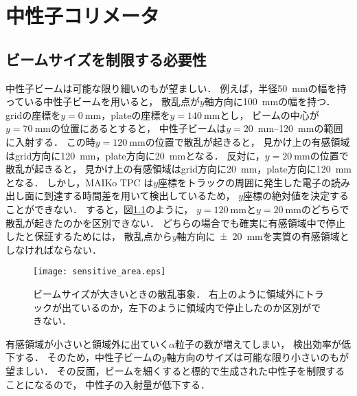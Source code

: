 \documentclass[../master]{subfiles}
\begin{document}
\chapter{中性子コリメータ}
\section{ビームサイズを制限する必要性}
中性子ビームは可能な限り細いのもが望ましい．
例えば，半径\SI{50}{\milli\metre}の幅を持っている中性子ビームを用いると，
散乱点が$y$軸方向に\SI{100}{\milli\metre}の幅を持つ．
gridの座標を$y = \SI{0}{\milli\metre}$，plateの座標を$y = \SI{140}{\milli\metre}$とし，
ビームの中心が$y = \SI{70}{\milli\metre}$の位置にあるとすると，
中性子ビームは$y = $\SIrange{20}{120}{\milli\metre}の範囲に入射する．
この時$y = \SI{120}{\milli\metre}$の位置で散乱が起きると，
見かけ上の有感領域はgrid方向に\SI{120}{\milli\metre}，plate方向に\SI{20}{\milli\metre}となる．
反対に，$y = \SI{20}{\milli\metre}$の位置で散乱が起きると，
見かけ上の有感領域はgrid方向に\SI{20}{\milli\metre}，plate方向に\SI{120}{\milli\metre}となる．
しかし，MAIKo TPC は$y$座標をトラックの周囲に発生した電子の読み出し面に到達する時間差を用いて検出しているため，
$y$座標の絶対値を決定することができない．
すると，図\ref{fig::sensitive_area}のように，
$y = \SI{120}{\milli\metre}$と$y = \SI{20}{\milli\metre}$のどちらで散乱が起きたのかを区別できない．
どちらの場合でも確実に有感領域中で停止したと保証するためには，
散乱点から$y$軸方向に\SI{\pm20}{\milli\metre}を実質の有感領域としなければならない．
\begin{figure}
  \centering
  \texttt{[image: sensitive\_area.eps]}
  \caption[ビームサイズが大きいときの散乱事象．]
          {ビームサイズが大きいときの散乱事象．
            右上のように領域外にトラックが出ているのか，左下のように領域内で停止したのか区別ができない．}
  \label{fig::sensitive_area}
\end{figure}

有感領域が小さいと領域外に出ていく$\alpha$粒子の数が増えてしまい，
検出効率が低下する．
そのため，中性子ビームの$y$軸方向のサイズは可能な限り小さいのもが望ましい．
その反面，ビームを細くすると標的で生成された中性子を制限することになるので，
中性子の入射量が低下する．
\end{document}

